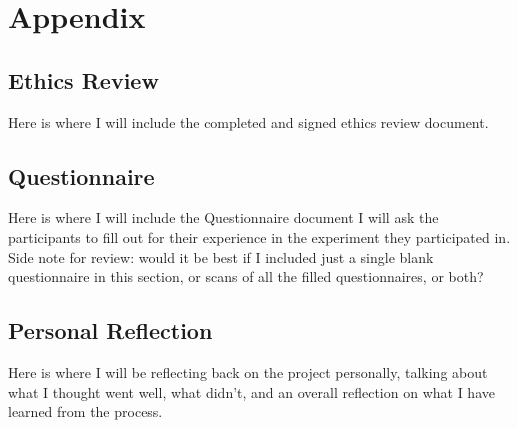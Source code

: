 \chapter{Appendix}
\label{appendix}

\section{Ethics Review}
\label{appendix:ethics}
Here is where I will include the completed and signed ethics review document.

\section{Questionnaire}
Here is where I will include the Questionnaire document I will ask the participants to fill out for their experience in the experiment they participated in. Side note for review: would it be best if I included just a single blank questionnaire in this section, or scans of all the filled questionnaires, or both?

\section{Personal Reflection}
Here is where I will be reflecting back on the project personally, talking about what I thought went well, what didn't, and an overall reflection on what I have learned from the process.

